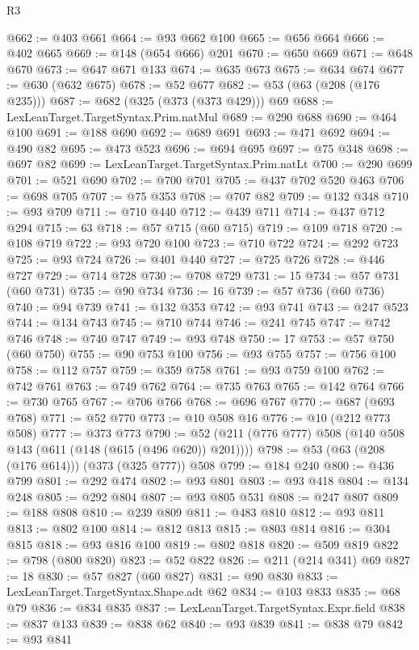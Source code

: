 \begin{lexlean}{R3}
\begin{coremodule}
@662 := @403 @661
@664 := @93 @662 @100
@665 := @656 @664
@666 := @402 @665
@669 := @148 (@654 @666) @201
@670 := @650 @669
@671 := @648 @670
@673 := @647 @671 @133
@674 := @635 @673
@675 := @634 @674
@677 := @630 (@632 @675)
@678 := @52 @677
@682 := @53 (@63 (@208 (@176 @235)))
@687 := @682 (@325 (@373 (@373 @429))) @69
@688 := LexLeanTarget.TargetSyntax.Prim.natMul
@689 := @290 @688
@690 := @464 @100
@691 := @188 @690
@692 := @689 @691
@693 := @471 @692
@694 := @490 @82
@695 := @473 @523
@696 := @694 @695
@697 := @75 @348
@698 := @697 @82
@699 := LexLeanTarget.TargetSyntax.Prim.natLt
@700 := @290 @699
@701 := @521 @690
@702 := @700 @701
@705 := @437 @702 @520 @463
@706 := @698 @705
@707 := @75 @353
@708 := @707 @82
@709 := @132 @348
@710 := @93 @709
@711 := @710 @440
@712 := @439 @711
@714 := @437 @712 @294
@715 := 63
@718 := @57 @715 (@60 @715)
@719 := @109 @718
@720 := @108 @719
@722 := @93 @720 @100
@723 := @710 @722
@724 := @292 @723
@725 := @93 @724
@726 := @401 @440
@727 := @725 @726
@728 := @446 @727
@729 := @714 @728
@730 := @708 @729
@731 := 15
@734 := @57 @731 (@60 @731)
@735 := @90 @734
@736 := 16
@739 := @57 @736 (@60 @736)
@740 := @94 @739
@741 := @132 @353
@742 := @93 @741
@743 := @247 @523
@744 := @134 @743
@745 := @710 @744
@746 := @241 @745
@747 := @742 @746
@748 := @740 @747
@749 := @93 @748
@750 := 17
@753 := @57 @750 (@60 @750)
@755 := @90 @753 @100
@756 := @93 @755
@757 := @756 @100
@758 := @112 @757
@759 := @359 @758
@761 := @93 @759 @100
@762 := @742 @761
@763 := @749 @762
@764 := @735 @763
@765 := @142 @764
@766 := @730 @765
@767 := @706 @766
@768 := @696 @767
@770 := @687 (@693 @768)
@771 := @52 @770
@773 := @10 @508 @16
@776 := @10 (@212 @773 @508)
@777 := @373 @773
@790 := @52 (@211 (@776 @777) @508 (@140 @508 @143 (@611 (@148 (@615 (@496 @620)) @201))))
@798 := @53 (@63 (@208 (@176 @614))) (@373 (@325 @777)) @508
@799 := @184 @240
@800 := @436 @799
@801 := @292 @474
@802 := @93 @801
@803 := @93 @418
@804 := @134 @248
@805 := @292 @804
@807 := @93 @805 @531
@808 := @247 @807
@809 := @188 @808
@810 := @239 @809
@811 := @483 @810
@812 := @93 @811
@813 := @802 @100
@814 := @812 @813
@815 := @803 @814
@816 := @304 @815
@818 := @93 @816 @100
@819 := @802 @818
@820 := @509 @819
@822 := @798 (@800 @820)
@823 := @52 @822
@826 := @211 (@214 @341) @69
@827 := 18
@830 := @57 @827 (@60 @827)
@831 := @90 @830
@833 := LexLeanTarget.TargetSyntax.Shape.adt @62
@834 := @103 @833
@835 := @68 @79
@836 := @834 @835
@837 := LexLeanTarget.TargetSyntax.Expr.field
@838 := @837 @133
@839 := @838 @62
@840 := @93 @839
@841 := @838 @79
@842 := @93 @841

\end{coremodule}
\end{lexlean}
